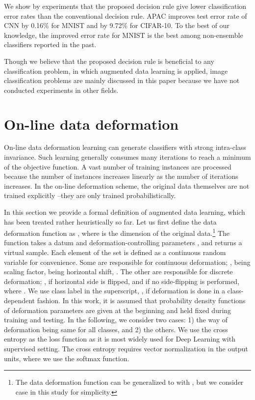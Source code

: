 \documentclass[10pt,twocolumn,letterpaper]{article}
\begin{document}
We show by experiments that the proposed decision rule give lower classification error rates than 
the conventional decision rule.
APAC improves test error rate of CNN by 0.16\% for MNIST and by 9.72\% for CIFAR-10.
To the best of our knowledge, the improved error rate for MNIST is the best among non-ensemble classifiers reported
in the past.

Though we believe that the proposed decision rule is beneficial to any classification problem,
in which augmented data learning is applied, 
image classification problems are mainly discussed in this paper
because we have not conducted experiments in other fields.

\section{On-line data deformation}

On-line data deformation learning can generate classifiers with strong intra-class invariance.
Such learning generally consumes many iterations to reach a minimum of the objective function.
A vast number of training instances are processed because 
the number of instances increases linearly as the number of iterations increases.
In the on-line deformation scheme, 
the original data themselves are not trained explicitly --they are only trained probabilistically.


In this section we provide a formal definition of augmented data learning, 
which has been treated rather heuristically so far.
Let us first define the data deformation function as
, where  is the dimension of the 
original data.\footnote{The data deformation function can be generalized to 
 with , 
but we consider  case in this study for simplicity.}
The function  
takes a datum  and deformation-controlling parameters ,
and returns a virtual sample.
Each element of the set  is defined as a continuous random variable for convenience.
Some are responsible for continuous deformation; 
\eg,  being scaling factor,  being horizontal shift, \etc.
The other are responsible for discrete deformation;
\eg, if  horizontal side is flipped, 
and if  no side-flipping is performed, 
where .
We use class label  in the superscript, , if deformation is done in a class-dependent fashion.
In this work, it is assumed that probability density functions of 
deformation parameters are given at the beginning and
held fixed during training and testing.
In the following, we consider two cases: 
1) the way of deformation being same for all classes, and 
2) the others.
We use the cross entropy as the loss function as it is most widely used for Deep Learning with supervised setting.
The cross entropy requires vector normalization in the output units, where we use the softmax function.
\end{document}
